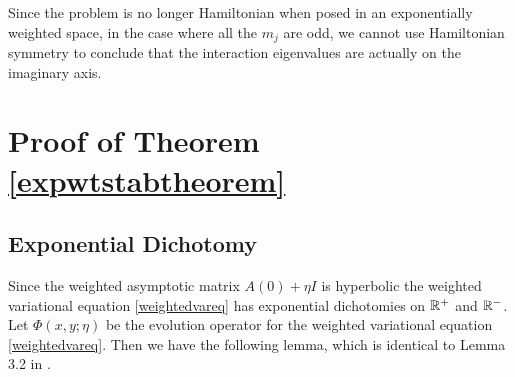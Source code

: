 \documentclass[thesis.tex]{subfiles}
\begin{document}
\begin{remark}
Since the problem is no longer Hamiltonian when posed in an exponentially weighted space, in the case where all the $m_j$ are odd, we cannot use Hamiltonian symmetry to conclude that the interaction eigenvalues are actually on the imaginary axis.
\end{remark}

\section{Proof of Theorem \ref{expwtstabtheorem}}

\subsection{Exponential Dichotomy}

Since the weighted asymptotic matrix $A(0) + \eta I$ is hyperbolic the weighted variational equation \cref{weightedvareq} has exponential dichotomies on $\mathbb{R}^+$ and $\mathbb{R}^-$. Let $\Phi(x, y; \eta)$ be the evolution operator for the weighted variational equation \cref{weightedvareq}. Then we have the following lemma, which is identical to Lemma 3.2 in \cite{Sandstede1998}.

\end{document}
